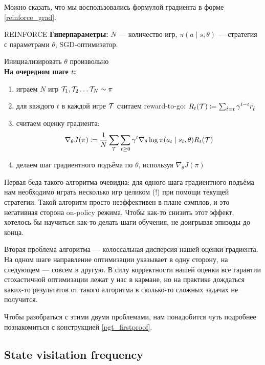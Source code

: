 Можно сказать, что мы воспользовались формулой градиента в форме \eqref{reinforce_grad}.

\begin{algorithm}[label = REINFORCE]{REINFORCE}
\textbf{Гиперпараметры:} $N$ --- количество игр, $\pi(a \mid s, \theta)$ --- стратегия с параметрами $\theta$, SGD-оптимизатор.

\vspace{0.3cm}
Инициализировать $\theta$ произвольно \\
\textbf{На очередном шаге $t$:}
\begin{enumerate}
    \item играем $N$ игр $\mathcal{T}_1, \mathcal{T}_2 \dots \mathcal{T}_N \sim \pi$
    \item для каждого $t$ в каждой игре $\mathcal{T}$ считаем reward-to-go: $R_t(\mathcal{T} ) \coloneqq \sum_{\hat{t} = t} \gamma^{\hat{t} - t} r_{\hat{t}}$
    \item считаем оценку градиента:
    $$\nabla_\theta J(\pi) \coloneqq \frac{1}{N}\sum_{\mathcal{T}} \sum_{t \ge 0} \gamma^t \nabla_\theta \log \pi(a_t \mid s_t, \theta) R_t(\mathcal{T} ) $$
    \item делаем шаг градиентного подъёма по $\theta$, используя $\nabla_\theta J(\pi)$
\end{enumerate}
\end{algorithm}

Первая беда такого алгоритма очевидна: для одного шага градиентного подъёма нам необходимо играть несколько игр целиком (!) при помощи текущей стратегии. Такой алгоритм просто неэффективен в плане сэмплов, и это негативная сторона on-policy режима. Чтобы как-то снизить этот эффект, хотелось бы научиться как-то делать шаги обучения, не доигрывая эпизоды до конца.

Вторая проблема алгоритма --- колоссальная дисперсия нашей оценки градиента. На одном шаге направление оптимизации указывает в одну сторону, на следующем --- совсем в другую. В силу корректности нашей оценки все гарантии стохастичной оптимизации лежат у нас в кармане, но на практике дождаться каких-то результатов от такого алгоритма в сколько-то сложных задачах не получится.

Чтобы разобраться с этими двумя проблемами, нам понадобится чуть подробнее познакомиться с конструкцией \eqref{pgt_firstproof}.

\subsection{State visitation frequency}

